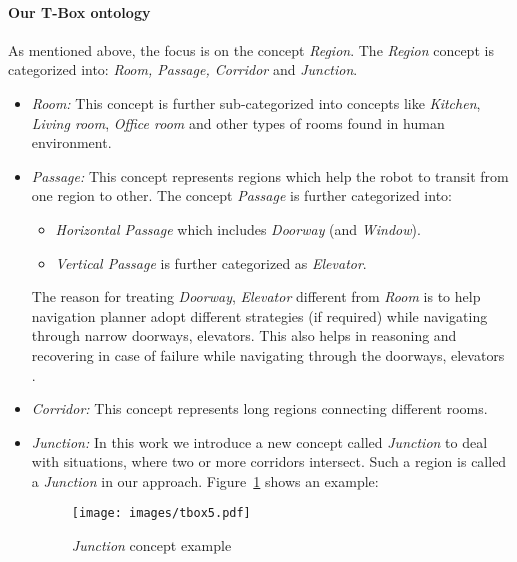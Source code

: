 \paragraph{Our T-Box ontology}
As mentioned above, the focus is on the concept \textit{Region}.
The \textit{Region} concept is categorized into: \textit{Room, Passage, Corridor} and \textit{Junction}.
\begin{itemize}
 \item \textit{Room:} This concept is further sub-categorized into concepts like \textit{Kitchen}, \textit{Living room}, \textit{Office room} and other types 
 of rooms found in human environment.
 \item \textit{Passage:} This concept represents regions which help the robot to transit from one region to other. The concept \textit{Passage} is further categorized into:
 \begin{itemize}
  \item \textit{Horizontal Passage} which includes \textit{Doorway} (and \textit{Window}).
  \item \textit{Vertical Passage} is further categorized as \textit{Elevator}.
 \end{itemize}
The reason for treating \textit{Doorway}, \textit{Elevator} different from \textit{Room} is to help navigation planner adopt different strategies (if required) 
while navigating through narrow doorways, elevators. 
This also helps in reasoning and recovering in case of failure while navigating through the doorways, elevators . 
 \item \textit{Corridor:} This concept represents long regions connecting different rooms.
 \item \textit{Junction:} In this work we introduce a new concept called \textit{Junction} to deal with situations, where two or more corridors intersect. 
Such a region is called a \textit{Junction} in our approach.
Figure~\ref{fig:jn} shows an example:
\begin{figure}[htbp] %
   \centering
   \texttt{[image: images/tbox5.pdf]}
   \caption{\textit{Junction} concept example}
   \label{fig:jn}
\end{figure}
\end{itemize}


\iffalse 
